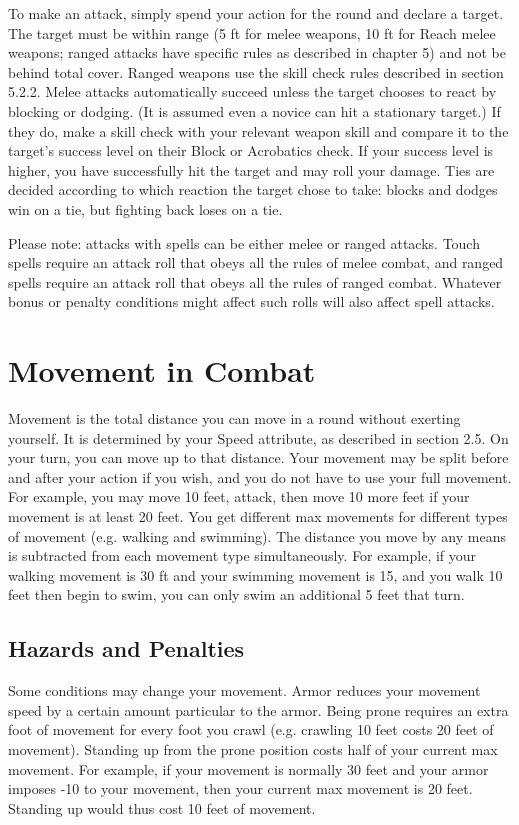 \documentclass[12pt]{book}
\begin{document}
To make an attack, simply spend your action for the round and declare a target. The target must be within range (5 ft for melee weapons, 10 ft for Reach melee weapons; ranged attacks have specific rules as described in chapter 5) and not be behind total cover. Ranged weapons use the skill check rules described in section 5.2.2. Melee attacks automatically succeed unless the target chooses to react by blocking or dodging. (It is assumed even a novice can hit a stationary target.) If they do, make a skill check with your relevant weapon skill and compare it to the target's success level on their Block or Acrobatics check. If your success level is higher, you have successfully hit the target and may roll your damage. Ties are decided according to which reaction the target chose to take: blocks and dodges win on a tie, but fighting back loses on a tie.

Please note: attacks with spells can be either melee or ranged attacks. Touch spells require an attack roll that obeys all the rules of melee combat, and ranged spells require an attack roll that obeys all the rules of ranged combat. Whatever bonus or penalty conditions might affect such rolls will also affect spell attacks.

\section{Movement in Combat}

Movement is the total distance you can move in a round without exerting yourself. It is determined by your Speed attribute, as described in section 2.5. On your turn, you can move up to that distance. Your movement may be split before and after your action if you wish, and you do not have to use your full movement. For example, you may move 10 feet, attack, then move 10 more feet if your movement is at least 20 feet. You get different max movements for different types of movement (e.g. walking and swimming). The distance you move by any means is subtracted from each movement type simultaneously. For example, if your walking movement is 30 ft and your swimming movement is 15, and you walk 10 feet then begin to swim, you can only swim an additional 5 feet that turn.

\subsection{Hazards and Penalties}
Some conditions may change your movement. Armor reduces your movement speed by a certain amount particular to the armor. Being prone requires an extra foot of movement for every foot you crawl (e.g. crawling 10 feet costs 20 feet of movement). Standing up from the prone position costs half of your current max movement. For example, if your movement is normally 30 feet and your armor imposes -10 to your movement, then your current max movement is 20 feet. Standing up would thus cost 10 feet of movement.
\end{document}
